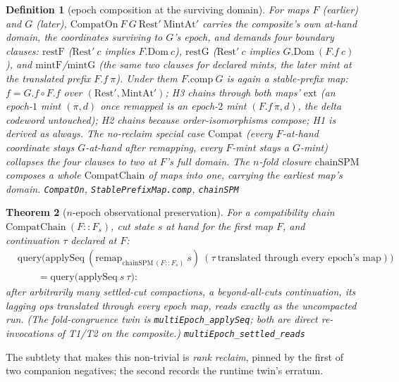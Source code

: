 \documentclass[11pt]{article}
\newtheorem{theorem}{Theorem}[section]
\newtheorem{definition}[theorem]{Definition}
\newcommand{\lean}[1]{\texttt{#1}}
\begin{document}
\begin{definition}[epoch composition at the surviving domain]
\label{def:spmcomp}
For maps $F$ (earlier) and $G$ (later), $\mathrm{CompatOn}\ F\ G\
\mathrm{Rest}'\ \mathrm{MintAt}'$ carries the \emph{composite's own}
at-hand domain, the coordinates surviving to $G$'s epoch, and demands
four boundary clauses: $\mathrm{restF}$ ($\mathrm{Rest}'\ c$ implies
$F.\mathrm{Dom}\ c$), $\mathrm{restG}$ ($\mathrm{Rest}'\ c$ implies
$G.\mathrm{Dom}\ (F.f\ c)$), and $\mathrm{mintF}$/$\mathrm{mintG}$
(the same two clauses for declared mints, the later mint at the
translated prefix $F.f\ \pi$). Under them $F.\mathrm{comp}\ G$ is
again a stable-prefix map: $f = G.f \circ F.f$ over
$(\mathrm{Rest}', \mathrm{MintAt}')$; H3 chains through both maps'
$\mathrm{ext}$ (an epoch-$1$ mint $(\pi, d)$ once remapped is an
epoch-$2$ mint $(F.f\,\pi, d)$, the delta codeword untouched); H2
chains because order-isomorphisms compose; H1 is derived as always.
The no-reclaim special case $\mathrm{Compat}$ (every $F$-at-hand
coordinate stays $G$-at-hand after remapping, every $F$-mint stays a
$G$-mint) collapses the four clauses to two at $F$'s full domain. The
$n$-fold closure $\mathrm{chainSPM}$ composes a whole
$\mathrm{CompatChain}$ of maps into one, carrying the \emph{earliest}
map's domain.
\hfill\lean{CompatOn}, \lean{StablePrefixMap.comp}, \lean{chainSPM}
\end{definition}

\begin{theorem}[$n$-epoch observational preservation]
\label{thm:multiepoch}
For a compatibility chain $\mathrm{CompatChain}\ (F :: F_s)$, cut
state $s$ at hand for the \emph{first} map $F$, and continuation
$\tau$ declared at $F$:
\[
\begin{aligned}
  &\mathrm{query}\bigl(\mathrm{applySeq}\
  (\mathrm{remap}_{\mathrm{chainSPM}\,(F :: F_s)}\ s)\
  (\tau\ \text{translated through every epoch's map})\bigr) \\
  &\qquad= \mathrm{query}\bigl(\mathrm{applySeq}\ s\ \tau\bigr) :
\end{aligned}
\]
after arbitrarily many settled-cut compactions, a beyond-all-cuts
continuation, its lagging ops translated through every epoch map,
reads exactly as the uncompacted run. (The fold-congruence twin is
\lean{multiEpoch\_applySeq}; both are direct re-invocations of T1/T2
on the composite.)
\hfill\lean{multiEpoch\_settled\_reads}
\end{theorem}

\noindent The subtlety that makes this non-trivial is \emph{rank
reclaim}, pinned by the first of two companion negatives; the second
records the runtime twin's erratum.
\end{document}
